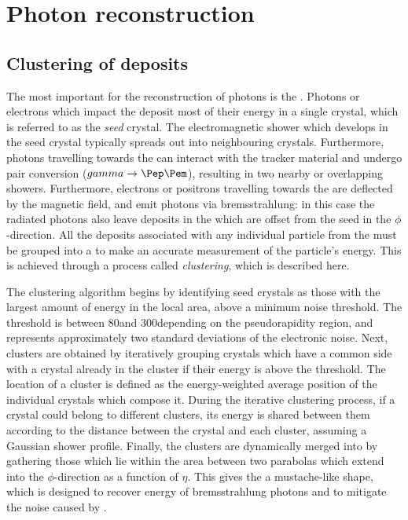 \section{Photon reconstruction} 
\label{reco:sec:photons}




\subsection{Clustering of \ECAL deposits}

The most important \subdetector for the reconstruction of photons is the \ECAL. Photons or electrons which impact the \ECAL deposit most of their energy in a single crystal, which is referred to as the \emph{seed} crystal. The electromagnetic shower which develops in the seed crystal typically spreads out into neighbouring crystals. Furthermore, photons travelling towards the \ECAL can interact with the tracker material and undergo pair conversion ($\gamma \rightarrow \Pep \Pem$), resulting in two nearby or overlapping showers. Furthermore, electrons or positrons travelling towards the \ECAL are deflected by the magnetic field, and emit photons via bremsstrahlung: in this case the radiated photons also leave deposits in the \ECAL which are offset from the seed in the $\phi$-direction. All the deposits associated with any individual particle from the \PV must be grouped into a \SC to make an accurate measurement of the particle's energy. This is achieved through a process called \emph{clustering}, which is described here.

The clustering algorithm begins by identifying seed crystals as those with the largest amount of energy in the local area, above a minimum noise threshold. The threshold is between 80\MeV and 300\MeV depending on the pseudorapidity region, and represents approximately two standard deviations of the electronic noise. Next, clusters are obtained by iteratively grouping crystals which have a common side with a crystal already in the cluster if their energy is above the threshold. The location of a cluster is defined as the energy-weighted average position of the individual crystals which compose it. During the iterative clustering process, if a crystal could belong to different clusters, its energy is shared between them according to the distance between the crystal and each cluster, assuming a Gaussian shower profile. Finally, the clusters are dynamically merged into \SC\s by gathering those which lie within the area between two parabolas which extend into the $\phi$-direction as a function of $\eta$. This gives the \SC\s a mustache-like shape, which is designed to recover energy of bremsstrahlung photons and to mitigate the noise caused by \PU.

